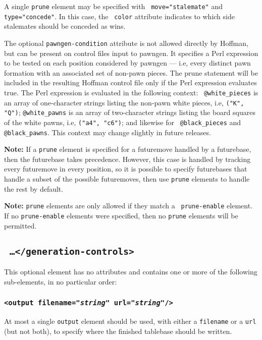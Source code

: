 \documentclass[11pt]{article}
\begin{document}
A single {\tt prune} element may be specified with {\tt
move="stalemate"} and {\tt type="concede"}.  In this case, the {\tt
color} attribute indicates to which side stalemates should be conceded
as wins.

The optional {\tt pawngen-condition} attribute is not allowed directly
by Hoffman, but can be present on control files input to pawngen.  It
specifies a Perl expression to be tested on each position considered
by pawngen --- i.e, every distinct pawn formation with an associated
set of non-pawn pieces.  The prune statement will be included in the
resulting Hoffman control file only if the Perl expression evaluates
true.  The Perl expression is evaluated in the following context: {\tt
@white\_pieces} is an array of one-character strings listing the
non-pawn white pieces, i.e, {\tt ("K", "Q")}; {\tt @white\_pawns} is
an array of two-character strings listing the board squares of the
white pawns, i.e, {\tt ("a4", "c6")}; and likewise for {\tt
@black\_pieces} and {\tt @black\_pawns}.  This context may change
slightly in future releases.

{\bf Note:} If a {\tt prune} element is specified for a futuremove
handled by a futurebase, then the futurebase takes precedence.
However, this case is handled by tracking every futuremove in every
position, so it is possible to specify futurebases that handle a
subset of the possible futuremoves, then use {\tt prune} elements to
handle the rest by default.

{\bf Note:} {\tt prune} elements are only allowed if they match a {\tt
prune-enable} element.  If no {\tt prune-enable} elements were
specified, then no {\tt prune} elements will be permitted.

\subsection{\tt <generation-controls> \ldots\qquad </generation-controls>}

This optional element has no attributes and contains one or more
of the following sub-elements, in no particular order:

\subsubsection{\tt <output filename="{\it string}" url="{\it string}"/>}

At most a single {\tt output} element should be used, with either a
{\tt filename} or a {\tt url} (but not both), to specify where
the finished tablebase should be written.
\end{document}

